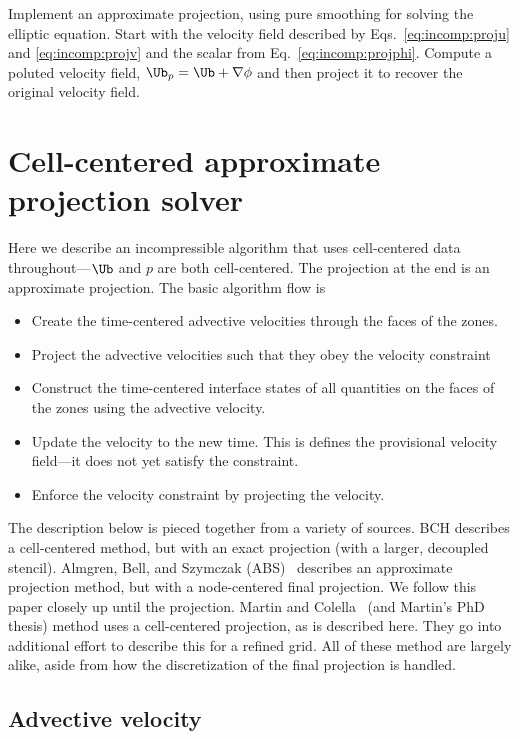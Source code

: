 \begin{exercise}
Implement an approximate projection, using pure smoothing for solving
the elliptic equation.  Start with the velocity field described
by Eqs.~\ref{eq:incomp:proju} and \ref{eq:incomp:projv} and the scalar
from Eq.~\ref{eq:incomp:projphi}.  Compute a poluted velocity field,
$\Ub_p = \Ub + \nabla \phi$ and then project it to recover the
original velocity field.
\end{exercise}

\section{Cell-centered approximate projection solver}

Here we describe an incompressible algorithm that uses cell-centered
data throughout---$\Ub$ and $p$ are both cell-centered.  The
projection at the end is an approximate projection.  The basic
algorithm flow is
\begin{itemize}
\item Create the time-centered advective velocities through the faces
  of the zones.
\item Project the advective velocities such that they obey the
  velocity constraint
\item Construct the time-centered interface states of all quantities
  on the faces of the zones using the advective velocity.
\item Update the velocity to the new time.  This is defines the
  provisional velocity field---it does not yet satisfy the constraint.
\item Enforce the velocity constraint by projecting the velocity.
\end{itemize}

The description below is pieced together from a variety of sources.
BCH describes a cell-centered method, but with an exact projection
(with a larger, decoupled stencil).  Almgren, Bell, and Szymczak
(ABS)~\cite{ABS} describes an approximate projection method, but with
a node-centered final projection.  We follow this paper closely up
until the projection.  Martin and Colella~\cite{MartinColella} (and
Martin's PhD thesis) method uses a cell-centered projection, as is
described here.  They go into additional effort to describe this for a
refined grid.  All of these method are largely alike, aside from how
the discretization of the final projection is handled.

\subsection{Advective velocity}

